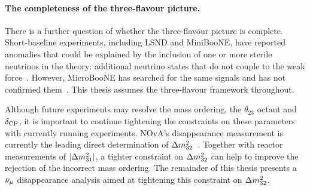 \paragraph{The completeness of the three-flavour picture.}
There is a further question of whether the three-flavour picture is complete.
Short-baseline experiments, including LSND and MiniBooNE, have
reported anomalies that could be explained by the inclusion of one or more
sterile neutrinos in the theory: additional neutrino states that do not couple to the weak force~\cite{LSND2001,MiniBooNE2018}.
However, MicroBooNE has searched for the same signals and
has not confirmed them~\cite{MicroBooNE2022}.
This thesis assumes the three-flavour framework throughout.

\medskip
\noindent
Although future experiments may resolve the mass ordering, the $\theta_{23}$ octant and $\delta_{\rm CP}$, it is important to continue tightening the constraints on these parameters with currently running experiments. NOvA's disappearance measurement is currently the leading direct determination of $\Delta m^{2}_{32}$~\citep[p.~2]{NOvA2025}. Together with reactor measurements of $|\Delta m^{2}_{31}|$, a tighter constraint on $\Delta m^{2}_{32}$ can help to improve the rejection of the incorrect mass ordering. The remainder of this thesis presents a $\nu_\mu$ disappearance analysis aimed at tightening this constraint on $\Delta m^{2}_{32}$.
